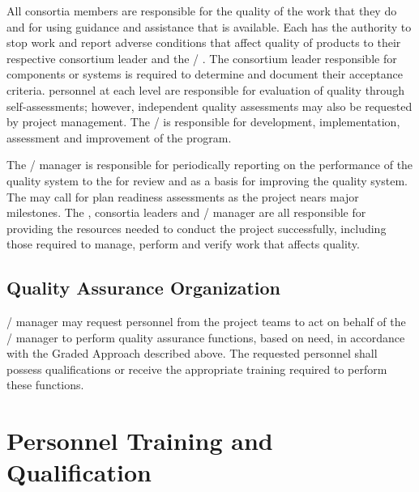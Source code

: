 All consortia members are responsible for the quality of the work that
they do and for using guidance and assistance that is available. Each
has the authority to stop work and report adverse conditions that
affect quality of  products to their respective  consortium
leader and the / . The consortium leader responsible
for  components or systems is required to determine and document
their acceptance criteria.  personnel at each level are
responsible for evaluation of quality through self-assessments;
however, independent quality assessments may also be requested by
project management.  The /  is responsible for
development, implementation, assessment and improvement of the 
program.

The /  manager is responsible for
periodically reporting on the performance of the quality system to the
  for review and as a basis for
improving the quality system. The  
may call for  plan readiness assessments as the project nears
major milestones. The  , consortia
leaders and /  manager are all responsible
for providing the resources needed to conduct the project
successfully, including those required to manage, perform and verify
work that affects quality.

\subsection{Quality Assurance Organization}

/  manager may request personnel
from the  project teams to act on behalf of the
/  manager to perform quality
assurance functions, based on need, in accordance with the Graded
Approach described above. The requested personnel shall possess
qualifications or receive the appropriate training required to perform
these functions.

\section{Personnel Training and Qualification}

